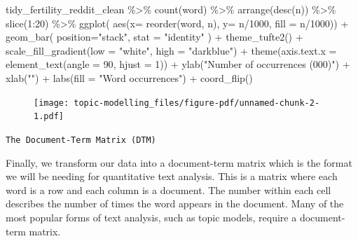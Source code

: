 \documentclass[
  letterpaper,
  DIV=11,
  numbers=noendperiod]{scrreprt}
\newenvironment{Shaded}{\begin{snugshade}}{\end{snugshade}}
\newcommand{\AttributeTok}[1]{\textcolor[rgb]{0.40,0.45,0.13}{#1}}
\newcommand{\DecValTok}[1]{\textcolor[rgb]{0.68,0.00,0.00}{#1}}
\newcommand{\FunctionTok}[1]{\textcolor[rgb]{0.28,0.35,0.67}{#1}}
\newcommand{\NormalTok}[1]{\textcolor[rgb]{0.00,0.23,0.31}{#1}}
\newcommand{\SpecialCharTok}[1]{\textcolor[rgb]{0.37,0.37,0.37}{#1}}
\newcommand{\StringTok}[1]{\textcolor[rgb]{0.13,0.47,0.30}{#1}}
\begin{document}
\begin{Shaded}
\begin{Highlighting}[]
\NormalTok{tidy\_fertility\_reddit\_clean }\SpecialCharTok{\%\textgreater{}\%} 
  \FunctionTok{count}\NormalTok{(word) }\SpecialCharTok{\%\textgreater{}\%} 
  \FunctionTok{arrange}\NormalTok{(}\FunctionTok{desc}\NormalTok{(n)) }\SpecialCharTok{\%\textgreater{}\%} 
  \FunctionTok{slice}\NormalTok{(}\DecValTok{1}\SpecialCharTok{:}\DecValTok{20}\NormalTok{) }\SpecialCharTok{\%\textgreater{}\%}
  \FunctionTok{ggplot}\NormalTok{( }\FunctionTok{aes}\NormalTok{(}\AttributeTok{x=} \FunctionTok{reorder}\NormalTok{(word, n), }\AttributeTok{y=}\NormalTok{ n}\SpecialCharTok{/}\DecValTok{1000}\NormalTok{, }\AttributeTok{fill =}\NormalTok{ n}\SpecialCharTok{/}\DecValTok{1000}\NormalTok{)) }\SpecialCharTok{+}
  \FunctionTok{geom\_bar}\NormalTok{( }\AttributeTok{position=}\StringTok{"stack"}\NormalTok{, }
            \AttributeTok{stat =} \StringTok{"identity"}
\NormalTok{            ) }\SpecialCharTok{+}
  \FunctionTok{theme\_tufte2}\NormalTok{() }\SpecialCharTok{+}
  \FunctionTok{scale\_fill\_gradient}\NormalTok{(}\AttributeTok{low =} \StringTok{"white"}\NormalTok{, }
                      \AttributeTok{high =} \StringTok{"darkblue"}\NormalTok{) }\SpecialCharTok{+}
  \FunctionTok{theme}\NormalTok{(}\AttributeTok{axis.text.x =} \FunctionTok{element\_text}\NormalTok{(}\AttributeTok{angle =} \DecValTok{90}\NormalTok{, }
                                   \AttributeTok{hjust =} \DecValTok{1}\NormalTok{)) }\SpecialCharTok{+}
  \FunctionTok{ylab}\NormalTok{(}\StringTok{"Number of occurrences (\textquotesingle{}000)"}\NormalTok{) }\SpecialCharTok{+}
  \FunctionTok{xlab}\NormalTok{(}\StringTok{""}\NormalTok{) }\SpecialCharTok{+}
  \FunctionTok{labs}\NormalTok{(}\AttributeTok{fill =} \StringTok{"Word occurrences"}\NormalTok{) }\SpecialCharTok{+}
  \FunctionTok{coord\_flip}\NormalTok{()}
\end{Highlighting}
\end{Shaded}

\begin{figure}[H]

{\centering \texttt{[image: topic-modelling\_files/figure-pdf/unnamed-chunk-2-1.pdf]}

}

\end{figure}

\texttt{The\ Document-Term\ Matrix\ (DTM)}

Finally, we transform our data into a document-term matrix which is the
format we will be needing for quantitative text analysis. This is a
matrix where each word is a row and each column is a document. The
number within each cell describes the number of times the word appears
in the document. Many of the most popular forms of text analysis, such
as topic models, require a document-term matrix.
\end{document}
